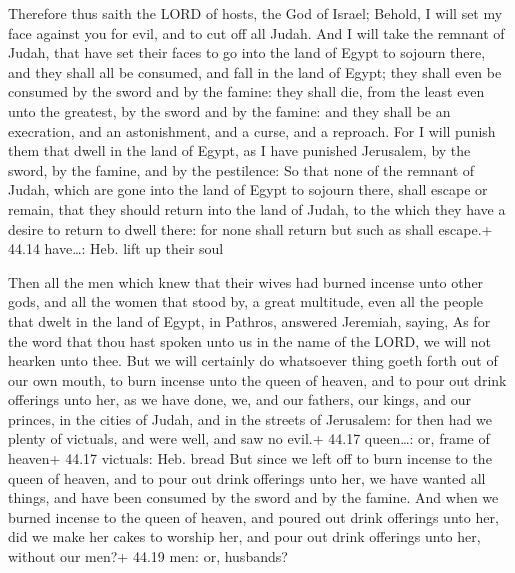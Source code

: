  Therefore thus saith the LORD of hosts, the God of
Israel; Behold, I will set my face against you for evil, and to cut off
all Judah.  And I will take the remnant of Judah, that have
set their faces to go into the land of Egypt to sojourn there, and they
shall all be consumed, and fall in the land of Egypt; they shall even be
consumed by the sword and by the famine: they shall die, from the least
even unto the greatest, by the sword and by the famine: and they shall
be an execration, and an astonishment, and a curse, and a reproach.
 For I will punish them that dwell in the land of Egypt, as
I have punished Jerusalem, by the sword, by the famine, and by the
pestilence:  So that none of the remnant of Judah, which
are gone into the land of Egypt to sojourn there, shall escape or
remain, that they should return into the land of Judah, to the which
they have a desire to return to dwell there: for none shall return but
such as shall escape.+ 44.14 have\ldots: Heb. lift up their soul

 Then all the men which knew that their wives had burned
incense unto other gods, and all the women that stood by, a great
multitude, even all the people that dwelt in the land of Egypt, in
Pathros, answered Jeremiah, saying,  As for the word that
thou hast spoken unto us in the name of the LORD, we will not hearken
unto thee.  But we will certainly do whatsoever thing goeth
forth out of our own mouth, to burn incense unto the queen of heaven,
and to pour out drink offerings unto her, as we have done, we, and our
fathers, our kings, and our princes, in the cities of Judah, and in the
streets of Jerusalem: for then had we plenty of victuals, and were well,
and saw no evil.+ 44.17 queen\ldots: or, frame of heaven+ 44.17
victuals: Heb. bread  But since we left off to burn incense
to the queen of heaven, and to pour out drink offerings unto her, we
have wanted all things, and have been consumed by the sword and by the
famine.  And when we burned incense to the queen of heaven,
and poured out drink offerings unto her, did we make her cakes to
worship her, and pour out drink offerings unto her, without our men?+
44.19 men: or, husbands?

